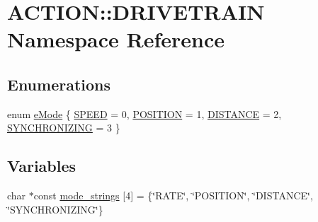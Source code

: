 \hypertarget{namespace_a_c_t_i_o_n_1_1_d_r_i_v_e_t_r_a_i_n}{
\section{\-A\-C\-T\-I\-O\-N\-:\-:\-D\-R\-I\-V\-E\-T\-R\-A\-I\-N \-Namespace \-Reference}
\label{namespace_a_c_t_i_o_n_1_1_d_r_i_v_e_t_r_a_i_n}
}
\subsection*{\-Enumerations}
\begin{DoxyCompactItemize}
\item 
enum \hyperlink{namespace_a_c_t_i_o_n_1_1_d_r_i_v_e_t_r_a_i_n_a52df779bea12a00bee80e6b0d57372a2}{e\-Mode} \{ \hyperlink{namespace_a_c_t_i_o_n_1_1_d_r_i_v_e_t_r_a_i_n_a52df779bea12a00bee80e6b0d57372a2a64e27eae9e553c04fc4c95c9f4d1df6f}{\-S\-P\-E\-E\-D} =  0, 
\hyperlink{namespace_a_c_t_i_o_n_1_1_d_r_i_v_e_t_r_a_i_n_a52df779bea12a00bee80e6b0d57372a2ae7eeec8b35a1b416a7d3ba799ed34a9f}{\-P\-O\-S\-I\-T\-I\-O\-N} =  1, 
\hyperlink{namespace_a_c_t_i_o_n_1_1_d_r_i_v_e_t_r_a_i_n_a52df779bea12a00bee80e6b0d57372a2aaeb9e2c6d80cf90036a0212e7008c8a1}{\-D\-I\-S\-T\-A\-N\-C\-E} =  2, 
\hyperlink{namespace_a_c_t_i_o_n_1_1_d_r_i_v_e_t_r_a_i_n_a52df779bea12a00bee80e6b0d57372a2a9c1e1ee3aca04f76f62735f83fbc6965}{\-S\-Y\-N\-C\-H\-R\-O\-N\-I\-Z\-I\-N\-G} =  3
 \}
\end{DoxyCompactItemize}
\subsection*{\-Variables}
\begin{DoxyCompactItemize}
\item 
char $\ast$const \hyperlink{namespace_a_c_t_i_o_n_1_1_d_r_i_v_e_t_r_a_i_n_af7f3dbf3458d52145ba68c97ed370713}{mode\-\_\-strings} \mbox{[}4\mbox{]} = \{\char`\"{}\-R\-A\-T\-E\char`\"{}, \char`\"{}\-P\-O\-S\-I\-T\-I\-O\-N\char`\"{}, \char`\"{}\-D\-I\-S\-T\-A\-N\-C\-E\char`\"{}, \char`\"{}\-S\-Y\-N\-C\-H\-R\-O\-N\-I\-Z\-I\-N\-G\char`\"{}\}
\end{DoxyCompactItemize}


